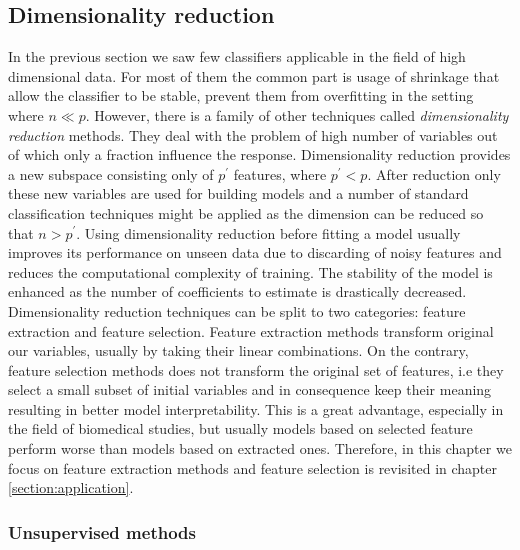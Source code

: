 \documentclass[12pt, wide]{mwart}
\begin{document}
\subsection{Dimensionality reduction}

In the previous section we saw few classifiers applicable in the field of high dimensional data. For most of them the common part is usage of shrinkage that allow the classifier to be stable, prevent them from overfitting in the setting where $n \ll p$. However, there is a family of other techniques called \textit{dimensionality reduction} methods. They deal with the problem of high number of variables out of which only a fraction influence the response. Dimensionality reduction provides a new subspace consisting only of $p^{\prime}$ features, where $p^{\prime} < p$. After reduction only these new variables are used for building models and a number of standard classification techniques might be applied as the dimension can be reduced so that $n > p^{\prime}$. Using dimensionality reduction before fitting a model usually improves its performance on unseen data due to discarding of noisy features and reduces the computational complexity of training. The stability of the model is enhanced as the number of coefficients to estimate is drastically decreased. Dimensionality reduction techniques can be split to two categories: feature extraction and feature selection. Feature extraction methods transform original our variables, usually by taking their linear combinations. On the contrary, feature selection methods does not transform the original set of features, i.e they select a small subset of initial variables and in consequence keep their meaning resulting in better model interpretability. This is a great advantage, especially in the field of biomedical studies, but usually models based on selected feature perform worse than models based on extracted ones. Therefore, in this chapter we focus on feature extraction methods and feature selection is revisited in chapter \ref{section:application}.

\subsubsection{Unsupervised methods}
\end{document}
